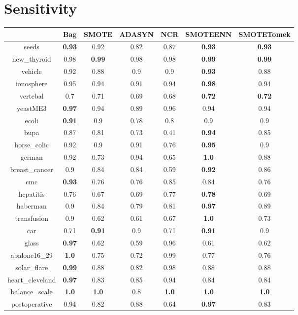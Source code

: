 \documentclass{article}%
\begin{document}
%
\section*{Sensitivity}%
\begin{tabular}{c|cccccc}%
&Bag&SMOTE&ADASYN&NCR&SMOTEENN&SMOTETomek\\%
\hline%
seeds&\textbf{0.93}&0.92&0.82&0.87&\textbf{0.93}&\textbf{0.93}\\%
new\_thyroid&0.98&\textbf{0.99}&0.98&0.98&\textbf{0.99}&\textbf{0.99}\\%
vehicle&0.92&0.88&0.9&0.9&\textbf{0.93}&0.88\\%
ionosphere&0.95&0.94&0.91&0.94&\textbf{0.98}&0.94\\%
vertebal&0.7&0.71&0.69&0.68&\textbf{0.72}&\textbf{0.72}\\%
yeastME3&\textbf{0.97}&0.94&0.89&0.96&0.94&0.94\\%
ecoli&\textbf{0.91}&0.9&0.78&0.8&0.9&0.9\\%
bupa&0.87&0.81&0.73&0.41&\textbf{0.94}&0.85\\%
horse\_colic&0.92&0.9&0.91&0.76&\textbf{0.95}&0.9\\%
german&0.92&0.73&0.94&0.65&\textbf{1.0}&0.88\\%
breast\_cancer&0.9&0.84&0.84&0.59&\textbf{0.92}&0.86\\%
cmc&\textbf{0.93}&0.76&0.76&0.85&0.84&0.76\\%
hepatitis&0.76&0.67&0.69&0.77&\textbf{0.78}&0.69\\%
haberman&0.9&0.84&0.79&0.81&\textbf{0.97}&0.89\\%
transfusion&0.9&0.62&0.61&0.67&\textbf{1.0}&0.73\\%
car&0.71&\textbf{0.91}&0.9&0.71&\textbf{0.91}&0.9\\%
glass&\textbf{0.97}&0.62&0.59&0.96&0.61&0.62\\%
abalone16\_29&\textbf{1.0}&0.75&0.72&0.99&0.77&0.76\\%
solar\_flare&\textbf{0.99}&0.88&0.82&0.98&0.88&0.88\\%
heart\_cleveland&\textbf{0.97}&0.83&0.85&0.94&0.84&0.84\\%
balance\_scale&\textbf{1.0}&\textbf{1.0}&0.8&\textbf{1.0}&\textbf{1.0}&\textbf{1.0}\\%
postoperative&0.94&0.82&0.88&0.64&\textbf{0.97}&0.83\\%
\end{tabular}

%
\end{document}
